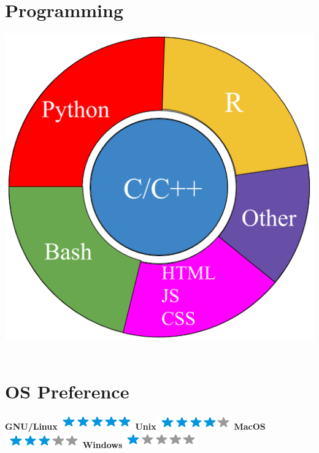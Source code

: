 \documentclass[]{friggeri-cv}
\begin{document}
\begin{aside}
  \section{Programming}
    \includegraphics[scale=0.2]{img/programming.png}
    ~
  \section{OS Preference}
    \textbf{GNU/Linux}\includegraphics[scale=0.40]{img/5stars.png}
    \textbf{Unix}\includegraphics[scale=0.40]{img/4stars.png}
    \textbf{MacOS}\includegraphics[scale=0.40]{img/3stars.png}
    \textbf{Windows}\includegraphics[scale=0.40]{img/1stars.png}
    ~
\end{aside}
\end{document}
